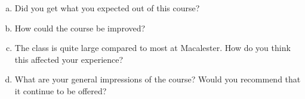 \begin{enumerate}[(a)]
\vspace*{1in}

\item Did you get what you expected out of this course?

\vspace*{1in}

\item How could the course be improved?

\vspace*{1in}

\item The class is quite large compared to most at Macalester.  How do you think this affected your experience?

\vspace*{1in}

\item What are your general impressions of the course?  Would you recommend that it continue to be offered?

\end{enumerate}


